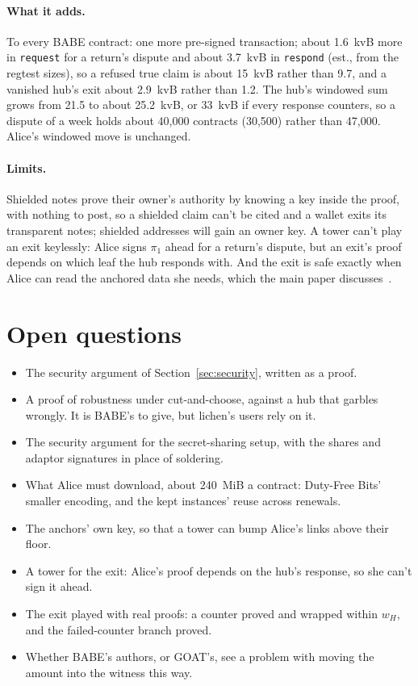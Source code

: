 \documentclass[11pt]{article}
\newcommand{\tx}[1]{\texttt{#1}}
\begin{document}
\paragraph{What it adds.} To every BABE contract: one more pre-signed
transaction; about 1.6~kvB more in \tx{request} for a return's dispute
and about 3.7~kvB in \tx{respond} (est., from the regtest sizes), so a
refused true claim is about 15~kvB rather than 9.7, and a vanished hub's
exit about 2.9~kvB rather than 1.2. The hub's windowed sum grows from
21.5 to about 25.2~kvB, or 33~kvB if every response counters, so a
dispute of a week holds about 40,000 contracts (30,500) rather than
47,000. Alice's windowed move is unchanged.

\paragraph{Limits.} Shielded notes prove their owner's authority by
knowing a key inside the proof, with nothing to post, so a shielded claim
can't be cited and a wallet exits its transparent notes; shielded
addresses will gain an owner key. A tower can't play an exit keylessly:
Alice signs $\pi_1$ ahead for a return's dispute, but an exit's proof
depends on which leaf the hub responds with. And the exit is safe
exactly when Alice can read the anchored data she needs, which the main
paper discusses~\cite{lichen}.

\section{Open questions}
\label{sec:open}

\begin{itemize}[leftmargin=1.5em]
\item The security argument of Section~\ref{sec:security}, written as a
  proof.
\item A proof of robustness under cut-and-choose, against a hub that
  garbles wrongly. It is BABE's to give, but lichen's users rely on it.
\item The security argument for the secret-sharing setup, with the
  shares and adaptor signatures in place of soldering.
\item What Alice must download, about 240~MiB a contract: Duty-Free
  Bits' smaller encoding, and the kept instances' reuse across renewals.
\item The anchors' own key, so that a tower can bump Alice's links above
  their floor.
\item A tower for the exit: Alice's proof depends on the hub's
  response, so she can't sign it ahead.
\item The exit played with real proofs: a counter proved and wrapped
  within $w_H$, and the failed-counter branch proved.
\item Whether BABE's authors, or GOAT's, see a problem with moving the
  amount into the witness this way.
\end{itemize}
\end{document}
